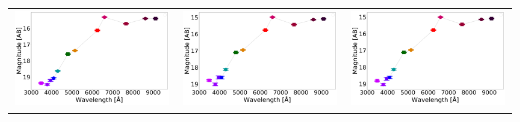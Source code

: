 \begin{table}
\begin{tabular}{ccc}
\includegraphics[width=0.3\linewidth, clip]{photopectrum_splus_MC0133-025038_aper.pdf} & \includegraphics[width=0.3\linewidth, clip]{photopectrum_splus_MC0133-025038_auto.pdf} & \includegraphics[width=0.3\linewidth, clip]{photopectrum_splus_MC0133-025038_petro.pdf} \\
\end{tabular}
\end{table}

